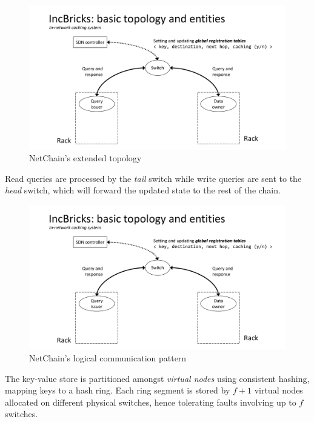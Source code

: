 \begin{figure}[!htb]
    \centering
        \includegraphics[page=6, clip, trim=3.6cm 0.7cm 3.2cm 4.15cm, width=1.00\textwidth]{figures/analysis/inp/solutions.pdf}
    \caption{NetChain's \texorpdfstring{\cite{netchain}}{} extended topology}
\end{figure}

Read queries are processed by the \textit{tail} switch while write queries are sent to the \textit{head} switch, which will forward the updated state to the rest of the chain.

\begin{figure}[!htb]
    \centering
        \includegraphics[page=7, clip, trim=3.6cm 0.7cm 3.6cm 4.15cm, width=1.00\textwidth]{figures/analysis/inp/solutions.pdf}
    \caption{NetChain's \texorpdfstring{\cite{netchain}}{} logical communication pattern}
\end{figure}

The key-value store is partitioned amongst \textit{virtual nodes} using consistent hashing, mapping keys to a hash ring.
Each ring segment is stored by $f + 1$ virtual nodes allocated on different physical switches, hence tolerating faults involving up to $f$ switches.

